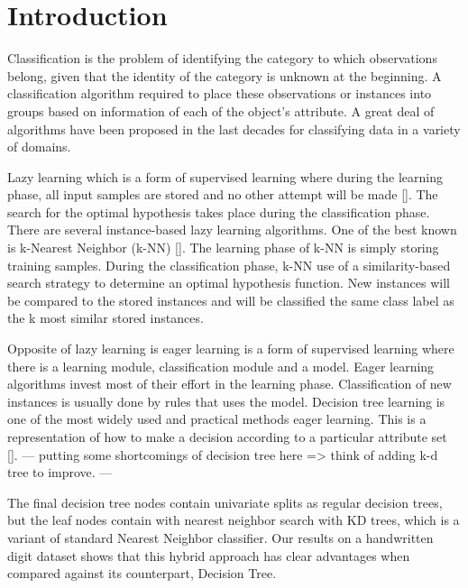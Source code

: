 \section{Introduction}
Classification is the problem of identifying the category to which observations belong, given that the identity of the category is unknown at the beginning. A classification algorithm required to place these observations or instances into groups based on information of each of the object’s attribute. A great deal of algorithms have been proposed in the last decades for classifying data in a variety of domains.

  Lazy learning which is a form of supervised learning where during the learning phase, all input samples are stored and no other attempt will be made []. The search for the optimal hypothesis takes place during the classification phase. There are several instance-based lazy learning algorithms. One of the best known is k-Nearest Neighbor (k-NN) []. The learning phase of k-NN is simply storing training samples. During the classification phase, k-NN use of a similarity-based search strategy to determine an optimal hypothesis function. New instances will be compared to the stored instances and will be classified the same class label as the k most similar stored instances.

  Opposite of lazy learning is eager learning is a form of supervised learning where there is a learning module, classification module and a model. Eager learning algorithms invest most of their effort in the learning phase. Classification of new instances is usually done by rules that uses the model. Decision tree learning is one of the most widely used and practical methods eager learning. This is a representation of how to make a decision according to a particular attribute set []. --- putting some shortcomings of decision tree here => think of adding k-d tree to improve. ---

  The final decision tree nodes contain univariate splits as regular decision trees, but the leaf nodes contain with nearest neighbor search with KD trees, which is a variant of standard Nearest Neighbor classifier. Our results on a handwritten digit dataset shows that this hybrid approach has clear advantages when compared against its counterpart, Decision Tree.
